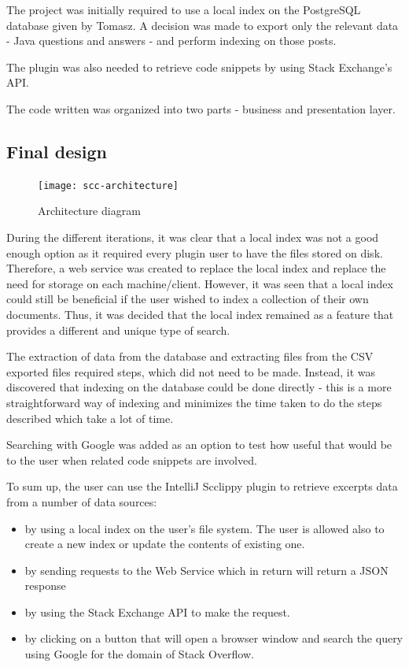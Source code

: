 \documentclass{l4proj}
\begin{document}
The project was initially required to use a local index on the PostgreSQL database given by Tomasz. A decision was made to export only the relevant data - Java questions and answers - and perform indexing on those posts. 

The plugin was also needed to retrieve code snippets by using Stack Exchange's API. 

The code written was organized into two parts - business and presentation layer.

\subsection{Final design}

\begin{figure}[H]
\texttt{[image: scc-architecture]}
\centering
\caption{Architecture diagram}
\label{fig:architecture}
\end{figure}

During the different iterations, it was clear that a local index was not a good enough option as it required every plugin user to have the files stored on disk. Therefore, a web service was created to replace the local index and replace the need for storage on each machine/client. However, it was seen that a local index could still be beneficial if the user wished to index a collection of their own documents. Thus, it was decided that the local index remained as a feature that provides a different and unique type of search.

The extraction of data from the database and extracting files from the CSV exported files required steps, which did not need to be made. Instead, it was discovered that indexing on the database could be done directly - this is a more straightforward way of indexing and minimizes the time taken to do the steps described which take a lot of time.

Searching with Google was added as an option to test how useful that would be to the user when related code snippets are involved.

To sum up, the user can use the IntelliJ Scclippy plugin to retrieve excerpts data from a number of data sources:

\begin{itemize}
\item by using a local index on the user's file system. The user is allowed also to create a new index or update the contents of existing one. 
\item by sending requests to the Web Service which in return will return a JSON response
\item by using the Stack Exchange API to make the request.
\item by clicking on a button that will open a browser window and search the query using Google for the domain of Stack Overflow. 
\end{itemize}
\end{document}
